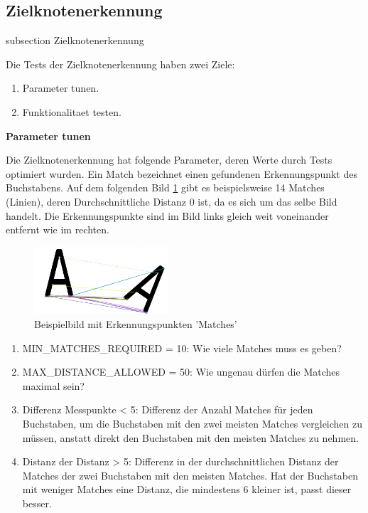 



\subsection*{Zielknotenerkennung}\label{target-node-unittests}
    {subsection}
    {Zielknotenerkennung}

Die Tests der Zielknotenerkennung haben zwei Ziele:

\begin{enumerate}
    \item Parameter tunen.
    \item Funktionalitaet testen.
\end{enumerate}

\textbf{Parameter tunen}

Die Zielknotenerkennung hat folgende Parameter, deren Werte durch Tests optimiert wurden. Ein Match bezeichnet einen gefundenen Erkennungspunkt des Buchstabens. Auf dem folgenden Bild \ref{img:orb-example} gibt es beispielsweise 14 Matches (Linien), deren Durchschnittliche Distanz 0 ist, da es sich um das selbe Bild handelt. Die Erkennungspunkte sind im Bild links gleich weit voneinander entfernt wie im rechten.

\begin{figure}[H]
\centering
\includegraphics[width=5cm]{assets/IT/testing/target_node/orb-a.png}
\caption{Beispielbild mit Erkennungspunkten 'Matches'}
\label{img:orb-example}
\end{figure}

\begin{enumerate}
    \item MIN\_MATCHES\_REQUIRED = 10: Wie viele Matches muss es geben?
    \item MAX\_DISTANCE\_ALLOWED = 50: Wie ungenau dürfen die Matches maximal sein?
    \item Differenz Messpunkte < 5: Differenz der Anzahl Matches für jeden Buchstaben, um die Buchstaben mit den zwei meisten Matches vergleichen zu müssen, anstatt direkt den Buchstaben mit den meisten Matches zu nehmen.
    \item Distanz der Distanz > 5: Differenz in der durchschnittlichen Distanz der Matches der zwei Buchstaben mit den meisten Matches. Hat der Buchstaben mit weniger Matches eine Distanz, die mindestens 6 kleiner ist, passt dieser besser.
\end{enumerate}

